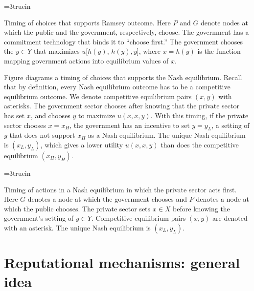 \centerline{\epsfxsize=3truein}
\caption{Timing of choices that supports Ramsey outcome.  Here $P$ and
$G$ denote nodes at which the public and the government, respectively,
choose. The government has a commitment technology that binds it to
``choose first.''   The government chooses the $y \in Y$ that maximizes
$u[h(y)$, $h(y),y]$, where $x=h(y)$ is the function mapping government
actions into equilibrium values of $x$.}
\endfigure

\medskip

Figure  diagrams a timing of choices that supports the
Nash equilibrium.  Recall that by definition, every Nash
equilibrium  outcome has to be a competitive equilibrium outcome.
We denote competitive equilibrium pairs $(x,y)$ with asterisks.
The government sector chooses after knowing that the private
sector has set $x$, and chooses $y$ to maximize
$u(x,x,y)$.  With this timing, if the private sector chooses
$x=x_H$, the government has an incentive to set $y=y_L$,
a setting of $y$ that does not support $x_H$ as a Nash
equilibrium.  The unique Nash equilibrium is $(x_L,y_L)$, which
gives a lower utility $u(x,x,y)$ than does
the competitive equilibrium $(x_H,y_H)$.


\centerline{\epsfxsize=3truein}
\caption{Timing of actions in a Nash equilibrium in which the private
sector acts first.  Here $G$ denotes a node at which the government
chooses and $P$ denotes a node at which the public chooses.  The private
sector sets $x \in X$ before knowing the government's setting of $y \in Y$.
Competitive equilibrium pairs $(x,y)$ are denoted with an asterisk.  The
unique Nash equilibrium is $(x_L, y_L)$.}
\endfigure


\section{Reputational mechanisms: general idea}

